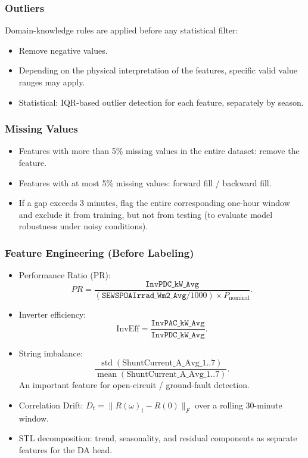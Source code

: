 \documentclass[11pt,a4paper]{article}
\begin{document}
\subsubsection*{Outliers}
Domain-knowledge rules are applied before any statistical filter:
\begin{itemize}
    \item Remove negative values.
    \item Depending on the physical interpretation of the features, specific valid value ranges may apply.
    \item Statistical: IQR-based outlier detection for each feature, separately by season.
\end{itemize}

\subsubsection*{Missing Values}
\begin{itemize}
    \item Features with more than 5\% missing values in the entire dataset: remove the feature.
    \item Features with at most 5\% missing values: forward fill / backward fill.
    \item If a gap exceeds 3 minutes, flag the entire corresponding one-hour window and exclude it from training, but not from testing (to evaluate model robustness under noisy conditions).
\end{itemize}

\subsubsection*{Feature Engineering (Before Labeling)}
\begin{itemize}
    \item Performance Ratio (PR):
    \[
        PR = \frac{\texttt{InvPDC\_kW\_Avg}}{(\texttt{SEWSPOAIrrad\_Wm2\_Avg}/1000)\times P_{\mathrm{nominal}}}.
    \]
    \item Inverter efficiency:
    \[
        \mathrm{InvEff} = \frac{\texttt{InvPAC\_kW\_Avg}}{\texttt{InvPDC\_kW\_Avg}}.
    \]
    \item String imbalance:
    \[
        \frac{\operatorname{std}(\text{ShuntCurrent\_A\_Avg\_1..7})}
             {\operatorname{mean}(\text{ShuntCurrent\_A\_Avg\_1..7})}.
    \]
    An important feature for open-circuit / ground-fault detection.
    \item Correlation Drift: $D_t = \lVert R(\omega)_t - R(0)\rVert_F$ over a rolling 30-minute window.
    \item STL decomposition: trend, seasonality, and residual components as separate features for the DA head.
\end{itemize}
\end{document}
